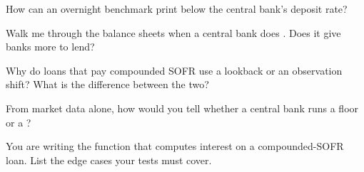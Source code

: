 \begin{interviewq}\label{iq:m2:central-banks-and-the-short-rate:2}
How can an overnight benchmark print below the central bank's deposit rate?
\end{interviewq}

\begin{interviewq}\label{iq:m2:central-banks-and-the-short-rate:3}
Walk me through the balance sheets when a central bank does . Does it give banks more to lend?
\end{interviewq}

\begin{interviewq}\label{iq:m2:central-banks-and-the-short-rate:4}
Why do loans that pay compounded SOFR use a lookback or an observation
shift? What is the difference between the two?
\end{interviewq}

\begin{interviewq}\label{iq:m2:central-banks-and-the-short-rate:5}
From market data alone, how would you tell whether a central bank runs a
floor or a ?
\end{interviewq}

\begin{interviewq}\label{iq:m2:central-banks-and-the-short-rate:6}
You are writing the function that computes interest on a compounded-SOFR
loan. List the edge cases your tests must cover.
\end{interviewq}
